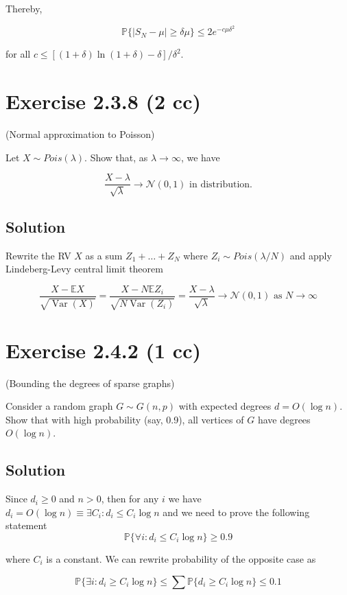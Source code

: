 \documentclass{article}
\DeclareMathOperator{\Var}{Var}
\begin{document}
Thereby,

$$\mathbb P \{|S_N-\mu| \geq \delta\mu\} \leq 2e^{-c\mu\delta^2}$$

for all $c \leq [(1+\delta)\ln (1+\delta) - \delta]/\delta^2$.

\section{Exercise 2.3.8 (2 cc)}
(Normal approximation to Poisson)

Let $X \sim Pois(\lambda)$. Show that, as $\lambda \to \infty$, we have

$$\frac{X-\lambda}{\sqrt \lambda} \to \mathcal N(0, 1) \text{ in distribution.}$$

\subsection{Solution}

Rewrite the RV $X$ as a sum $Z_1 + \dots + Z_N$ where $Z_i \sim Pois(\lambda/N)$ and apply Lindeberg-Levy central limit theorem

$$\frac{X - \mathbb E X}{\sqrt{\Var(X)}} = \frac{X - N \mathbb E Z_i}{\sqrt{N \Var(Z_i)}} = \frac{X-\lambda}{\sqrt \lambda} \to \mathcal N(0, 1) \text{ as } N \to \infty$$

\section{Exercise 2.4.2 (1 cc)}

(Bounding the degrees of sparse graphs)

Consider a random graph $G \sim G(n,p)$ with expected degrees $d = O(\log n)$. Show that with high probability (say, 0.9), all vertices of $G$ have degrees $O(\log n)$.

\subsection{Solution}

Since $d_i \geq 0$ and $n > 0$, then for any $i$ we have $d_i = O(\log n) \equiv \exists C_i: d_i \leq C_i \log n$ and we need to prove the following statement
$$\mathbb P \{ \forall i : d_i \leq C_i \log n \} \geq 0.9$$

where $C_i$ is a constant. We can rewrite probability of the opposite case as

$$\mathbb P \{ \exists i : d_i \geq C_i \log n \} \leq \sum \mathbb P \{ d_i \geq C_i \log n \} \leq 0.1$$
\end{document}
